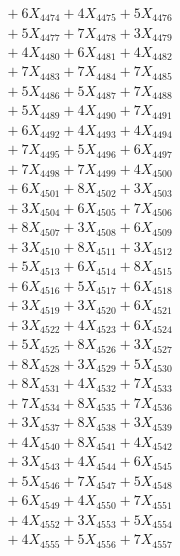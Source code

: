 \documentclass[a4paper,10pt]{article}
\begin{document}
{\begin{align}
&\;  + 6 X_{4474} + 4 X_{4475} + 5 X_{4476} \\[0.3ex]
&\;  + 5 X_{4477} + 7 X_{4478} + 3 X_{4479} \\[0.5ex]\allowbreak
&\;  + 4 X_{4480} + 6 X_{4481} + 4 X_{4482} \\[0.3ex]
&\;  + 7 X_{4483} + 7 X_{4484} + 7 X_{4485} \\[0.3ex]
&\;  + 5 X_{4486} + 5 X_{4487} + 7 X_{4488} \\[0.3ex]
&\;  + 5 X_{4489} + 4 X_{4490} + 7 X_{4491} \\[0.3ex]
&\;  + 6 X_{4492} + 4 X_{4493} + 4 X_{4494} \\[0.3ex]
&\;  + 7 X_{4495} + 5 X_{4496} + 6 X_{4497} \\[0.3ex]
&\;  + 7 X_{4498} + 7 X_{4499} + 4 X_{4500} \\[0.3ex]
&\;  + 6 X_{4501} + 8 X_{4502} + 3 X_{4503} \\[0.3ex]
&\;  + 3 X_{4504} + 6 X_{4505} + 7 X_{4506} \\[0.3ex]
&\;  + 8 X_{4507} + 3 X_{4508} + 6 X_{4509} \\[0.5ex]\allowbreak
&\;  + 3 X_{4510} + 8 X_{4511} + 3 X_{4512} \\[0.3ex]
&\;  + 5 X_{4513} + 6 X_{4514} + 8 X_{4515} \\[0.3ex]
&\;  + 6 X_{4516} + 5 X_{4517} + 6 X_{4518} \\[0.3ex]
&\;  + 3 X_{4519} + 3 X_{4520} + 6 X_{4521} \\[0.3ex]
&\;  + 3 X_{4522} + 4 X_{4523} + 6 X_{4524} \\[0.3ex]
&\;  + 5 X_{4525} + 8 X_{4526} + 3 X_{4527} \\[0.3ex]
&\;  + 8 X_{4528} + 3 X_{4529} + 5 X_{4530} \\[0.3ex]
&\;  + 8 X_{4531} + 4 X_{4532} + 7 X_{4533} \\[0.3ex]
&\;  + 7 X_{4534} + 8 X_{4535} + 7 X_{4536} \\[0.3ex]
&\;  + 3 X_{4537} + 8 X_{4538} + 3 X_{4539} \\[0.5ex]\allowbreak
&\;  + 4 X_{4540} + 8 X_{4541} + 4 X_{4542} \\[0.3ex]
&\;  + 3 X_{4543} + 4 X_{4544} + 6 X_{4545} \\[0.3ex]
&\;  + 5 X_{4546} + 7 X_{4547} + 5 X_{4548} \\[0.3ex]
&\;  + 6 X_{4549} + 4 X_{4550} + 7 X_{4551} \\[0.3ex]
&\;  + 4 X_{4552} + 3 X_{4553} + 5 X_{4554} \\[0.3ex]
&\;  + 4 X_{4555} + 5 X_{4556} + 7 X_{4557} \\[0.3ex]

\end{align}}
\end{document}
